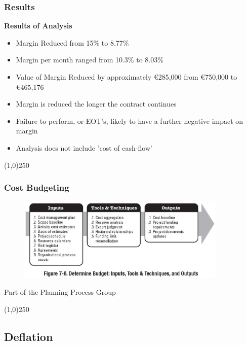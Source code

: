 \begin{frame}
\frametitle{Results}
\textbf{Results of Analysis}
\begin{itemize}
	\item Margin Reduced from 15\% to 8.77\%
	\item Margin per month ranged from 10.3\% to 8.03\%
	\item Value of Margin Reduced by approximately \euro285,000 from \euro750,000 to \euro465,176
	\item Margin is reduced the longer the contract continues
\end{itemize}
\begin{itemize}
	\item Failure to perform, or EOT's, likely to have a further negative impact on margin
	\item Analysis does not include 'cost of cash-flow'
\end{itemize}
\end{frame}
\begin{center}\line(1,0){250}\end{center}










\begin{frame}
\frametitle{Cost Budgeting}
\begin{figure}
	\centering
		\includegraphics[width = 10cm]{images/Fig7-6.jpg}
	\label{fig:7-6a}
\end{figure}
Part of the Planning Process Group
\end{frame}
\begin{center}\line(1,0){250}\end{center}




\subsection{Deflation}

